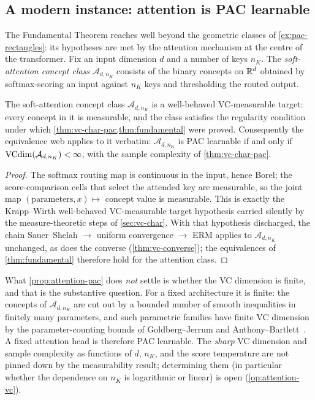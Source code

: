 
\subsection{A modern instance: attention is PAC learnable}
\label{sec:attention-pac}

The Fundamental Theorem reaches well beyond the geometric classes of \cref{ex:pac-rectangles}: its hypotheses are met by the attention mechanism at the centre of the transformer.  Fix an input dimension $d$ and a number of keys $n_K$.  The \emph{soft-attention concept class} $\mathcal{A}_{d,n_K}$ consists of the binary concepts on $\mathbb{R}^d$ obtained by softmax-scoring an input against $n_K$ keys and thresholding the routed output.

\begin{prop}
\label{prop:attention-pac}
The soft-attention concept class $\mathcal{A}_{d,n_K}$ is a well-behaved VC-measurable target: every concept in it is measurable, and the class satisfies the regularity condition under which \cref{thm:vc-char-pac,thm:fundamental} were proved. Consequently the equivalence web applies to it verbatim: $\mathcal{A}_{d,n_K}$ is PAC learnable if and only if $\mathrm{VCdim}(\mathcal{A}_{d,n_K}) < \infty$, with the sample complexity of \cref{thm:vc-char-pac}.
\end{prop}

\begin{proof}
The softmax routing map is continuous in the input, hence Borel; the score-comparison cells that select the attended key are measurable, so the joint map $(\text{parameters}, x) \mapsto$ concept value is measurable. This is exactly the Krapp--Wirth well-behaved VC-measurable target hypothesis carried silently by the measure-theoretic steps of \cref{sec:vc-char}.  With that hypothesis discharged, the chain Sauer--Shelah $\to$ uniform convergence $\to$ ERM applies to $\mathcal{A}_{d,n_K}$ unchanged, as does the converse (\cref{thm:vc-converse}); the equivalences of \cref{thm:fundamental} therefore hold for the attention class.
\end{proof}

What \cref{prop:attention-pac} does \emph{not} settle is whether the VC dimension is finite, and that is the substantive question.  For a fixed architecture it is finite: the concepts of $\mathcal{A}_{d,n_K}$ are cut out by a bounded number of smooth inequalities in finitely many parameters, and such parametric families have finite VC dimension by the parameter-counting bounds of Goldberg--Jerrum and Anthony--Bartlett~\cite{AnthonyBartlett1999}.  A fixed attention head is therefore PAC learnable.  The \emph{sharp} VC dimension and sample complexity as functions of $d$, $n_K$, and the score temperature are not pinned down by the measurability result; determining them (in particular whether the dependence on $n_K$ is logarithmic or linear) is open (\cref{op:attention-vc}).

